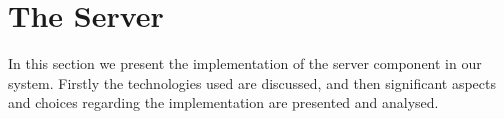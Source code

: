 \chapter{The Server}\label{cha:the_server}
In this section we present the implementation of the server component in our system.
Firstly the technologies used are discussed, and then significant aspects and choices regarding the implementation are presented and analysed.
